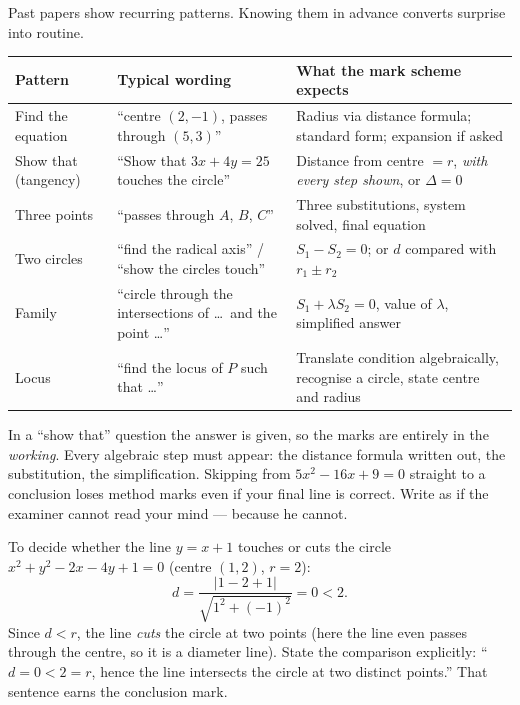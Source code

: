 \documentclass[11pt]{article}
\begin{document}
Past papers show recurring patterns. Knowing them in advance converts surprise into routine.

\begin{center}
\begin{tabularx}{\linewidth}{|l|X|X|}
\hline
\rowcolor{popblueL} \textbf{Pattern} & \textbf{Typical wording} & \textbf{What the mark scheme expects} \\
\hline
Find the equation & ``centre $(2,-1)$, passes through $(5,3)$'' & Radius via distance formula; standard form; expansion if asked \\
\hline
Show that (tangency) & ``Show that $3x+4y=25$ touches the circle'' & Distance from centre $=r$, \emph{with every step shown}, or $\Delta=0$ \\
\hline
Three points & ``passes through $A$, $B$, $C$'' & Three substitutions, system solved, final equation \\
\hline
Two circles & ``find the radical axis'' / ``show the circles touch'' & $S_1-S_2=0$; or $d$ compared with $r_1\pm r_2$ \\
\hline
Family & ``circle through the intersections of \dots\ and the point \dots'' & $S_1+\lambda S_2=0$, value of $\lambda$, simplified answer \\
\hline
Locus & ``find the locus of $P$ such that \dots'' & Translate condition algebraically, recognise a circle, state centre and radius \\
\hline
\end{tabularx}
\end{center}

\begin{attention}
In a ``show that'' question the answer is given, so the marks are entirely in the \emph{working}. Every algebraic step must appear: the distance formula written out, the substitution, the simplification. Skipping from $5x^2-16x+9=0$ straight to a conclusion loses method marks even if your final line is correct. Write as if the examiner cannot read your mind — because he cannot.
\end{attention}

\begin{exemplebox}
To decide whether the line $y=x+1$ touches or cuts the circle $x^2+y^2-2x-4y+1=0$ (centre $(1,2)$, $r=2$):
\[
d=\frac{|1-2+1|}{\sqrt{1^2+(-1)^2}}=0<2.
\]
Since $d<r$, the line \emph{cuts} the circle at two points (here the line even passes through the centre, so it is a diameter line). State the comparison explicitly: ``$d=0<2=r$, hence the line intersects the circle at two distinct points.'' That sentence earns the conclusion mark.
\end{exemplebox}
\end{document}
